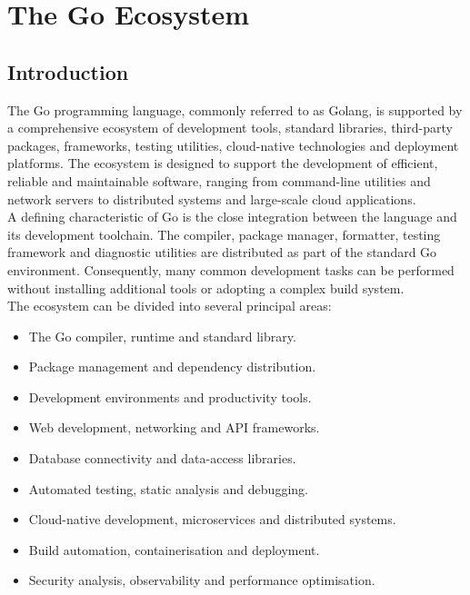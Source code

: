 \section{The Go Ecosystem}

\subsection{Introduction}

The Go programming language, commonly referred to as Golang, is supported by a comprehensive ecosystem of development tools, standard libraries, third-party packages, frameworks, testing utilities, cloud-native technologies and deployment platforms. The ecosystem is designed to support the development of efficient, reliable and maintainable software, ranging from command-line utilities and network servers to distributed systems and large-scale cloud applications.\\

A defining characteristic of Go is the close integration between the language and its development toolchain. The compiler, package manager, formatter, testing framework and diagnostic utilities are distributed as part of the standard Go environment. Consequently, many common development tasks can be performed without installing additional tools or adopting a complex build system.\\

The ecosystem can be divided into several principal areas:

\begin{itemize}
    \item The Go compiler, runtime and standard library.
    \item Package management and dependency distribution.
    \item Development environments and productivity tools.
    \item Web development, networking and API frameworks.
    \item Database connectivity and data-access libraries.
    \item Automated testing, static analysis and debugging.
    \item Cloud-native development, microservices and distributed systems.
    \item Build automation, containerisation and deployment.
    \item Security analysis, observability and performance optimisation.
\end{itemize}

